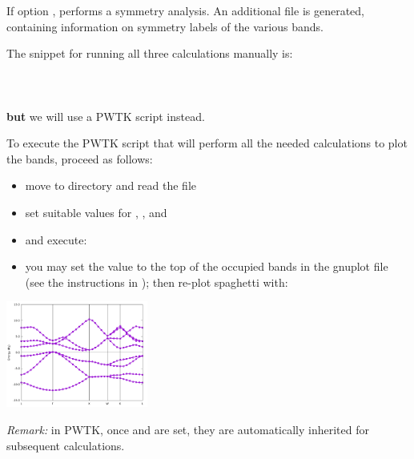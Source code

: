 \documentclass[landscape]{foils}
\begin{document}
If option ,  performs a symmetry
analysis. An additional file  is generated,
containing information on symmetry labels of the various bands.

The snippet for running all three calculations manually is:\\[0.5em]
\\
\\
\\[0.5em]
{\bf  but} we will use a PWTK script instead.

%
To execute the PWTK script that will perform all the needed
calculations to plot the bands, proceed as follows:\\
\parbox{0.65\textwidth}{
  \begin{itemize}
  \item move to directory
     and read the  file
  \item set suitable values for , , and
  \item and execute: ~
  \item you may set the  value to the top of the occupied
    bands in the gnuplot file  (see the instructions in
    ); then re-plot spaghetti with: 
  \end{itemize}
}\parbox{0.35\textwidth}{
  \begin{flushright}
    \includegraphics[width=0.35\textwidth]{figs/si-bands.pdf}
  \end{flushright}
}

{\em Remark:} in PWTK, once  and  are set,
they are automatically inherited for subsequent calculations.
\end{document}
